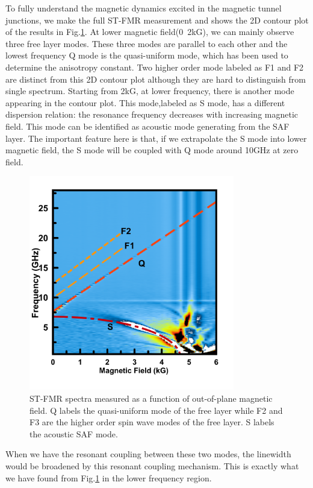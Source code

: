 To fully understand the magnetic dynamics excited in the magnetic tunnel junctions, we make the full ST-FMR measurement and shows the 2D contour plot of the results in Fig.\ref{fig:2D}. At lower magnetic field(0~2kG), we can mainly observe three free layer modes. These three modes are parallel to each other and the lowest frequency Q mode is the quasi-uniform mode, which has been used to determine the anisotropy constant. Two higher order mode labeled as F1 and F2 are distinct from this 2D contour plot although they are hard to distinguish from single spectrum.
Starting from 2kG, at lower frequency, there is another mode appearing in the contour plot. This mode,labeled as S mode, has a different dispersion relation: the resonance frequency decreases with increasing magnetic field. This mode can be identified as acoustic mode generating from the SAF layer. The important feature here is that, if we extrapolate the S mode into lower magnetic field, the S mode will be coupled with Q mode around 10GHz at zero field.  

\begin{figure}[!ht]
  \includegraphics[width=0.8\textwidth]{fig/FieldMod/contour.png}
  \centering
  \caption{ST-FMR spectra measured as a function of out-of-plane magnetic field. Q labels the quasi-uniform mode of the free layer while F2 and F3 are the higher order spin wave modes of the free layer. S labels the acoustic SAF mode. }
  \label{fig:2D}
\end{figure}


When we have the resonant coupling between these two modes, the linewidth would be broadened by this resonant coupling mechanism. This is exactly what we have found from Fig.\ref{fig:2D} in the lower frequency region.

